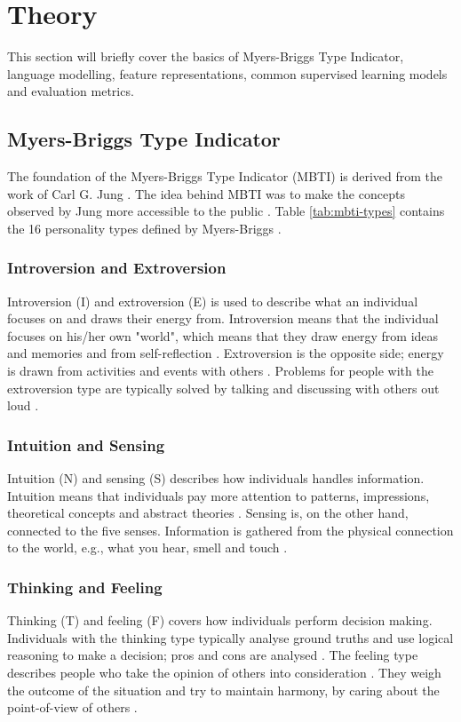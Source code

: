 \section{Theory} \label{sec:theory}

This section will briefly cover the basics of Myers-Briggs Type Indicator, language modelling, feature representations, common supervised learning models and evaluation metrics.

\subsection{Myers-Briggs Type Indicator}
The foundation of the Myers-Briggs Type Indicator (MBTI) is derived from the work of Carl G. Jung \cite{jung2014psychological}.
The idea behind MBTI was to make the concepts observed by Jung more accessible to the public \cite{mbti}.
Table \ref{tab:mbti-types} contains the 16 personality types defined by Myers-Briggs \cite{mbti}.

\subsubsection{Introversion and Extroversion}
Introversion (I) and extroversion (E) is used to describe what an individual focuses on and draws their energy from.
Introversion means that the individual focuses on his/her own "world", which means that they draw energy from ideas and memories and from self-reflection \cite{mbti-IE}.
Extroversion is the opposite side; energy is drawn from activities and events with others \cite{mbti-IE}.
Problems for people with the extroversion type are typically solved by talking and discussing with others out loud \cite{mbti-IE}.

\subsubsection{Intuition and Sensing}
Intuition (N) and sensing (S) describes how individuals handles information.
Intuition means that individuals pay more attention to patterns, impressions, theoretical concepts and abstract theories \cite{mbti-NS}.
Sensing is, on the other hand, connected to the five senses.
Information is gathered from the physical connection to the world, e.g., what you hear, smell and touch \cite{mbti-NS}.

\subsubsection{Thinking and Feeling}
Thinking (T) and feeling (F) covers how individuals perform decision making.
Individuals with the thinking type typically analyse ground truths and use logical reasoning to make a decision; pros and cons are analysed \cite{mbti-TF}.
The feeling type describes people who take the opinion of others into consideration \cite{mbti-TF}.
They weigh the outcome of the situation and try to maintain harmony, by caring about the point-of-view of others \cite{mbti-TF}.


